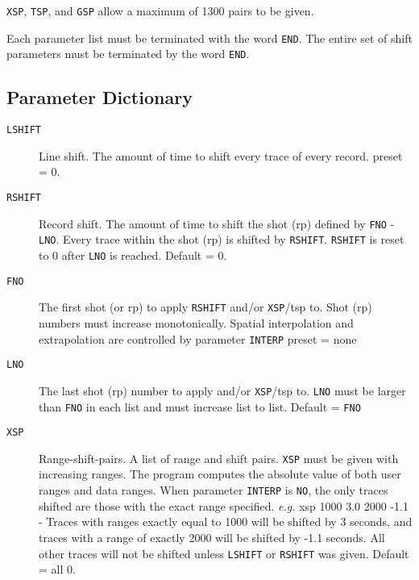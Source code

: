 \texttt{XSP}, \texttt{TSP}, and \texttt{GSP} allow a maximum of 1300 pairs to be given.

Each parameter list must be terminated with the word \texttt{END}.  The entire
set of shift parameters must be terminated by the word \texttt{END}.


\subsection{Parameter Dictionary}

\begin{description}
\item[\texttt{LSHIFT}] Line shift. The amount of time to shift every trace of every
         record.
         \Gls{preset} = 0.

\item[\texttt{RSHIFT}] Record shift.  The amount of time to shift the \gls{shot} (\gls{rp})
         defined by \texttt{FNO} - \texttt{LNO}.  Every trace within the \gls{shot} (\gls{rp}) is
         shifted by \texttt{RSHIFT}.  \texttt{RSHIFT} is reset to 0 after \texttt{LNO} is reached.
         Default = 0.

\item[\texttt{FNO}] The first \gls{shot} (or \gls{rp}) to apply \texttt{RSHIFT} and/or \texttt{XSP}/tsp to. Shot
         (\gls{rp}) numbers must increase monotonically.  Spatial
         interpolation and extrapolation are controlled by parameter
         \texttt{INTERP}
         \Gls{preset} = none

\item[\texttt{LNO}] The last \gls{shot} (\gls{rp}) number to apply and/or \texttt{XSP}/tsp to.  \texttt{LNO} must
         be larger than \texttt{FNO} in each list and must increase list to list.
         Default = \texttt{FNO}

\item[\texttt{XSP}] Range-shift-pairs.  A list of range and shift pairs.  \texttt{XSP} must
         be given with increasing ranges.  The program computes the
         absolute value of both user ranges and data ranges.  When
         parameter \texttt{INTERP} is \texttt{NO}, the only traces shifted are those
         with the exact range specified.
         \textit{e.g.} xsp 1000 3.0 2000 -1.1  - Traces with ranges exactly equal
         to 1000 will be shifted by 3 seconds, and traces with a range
         of exactly 2000 will be shifted by -1.1 seconds.  All other
         traces will not be shifted unless \texttt{LSHIFT} or \texttt{RSHIFT} was given.
         Default = all 0.


\end{description}

